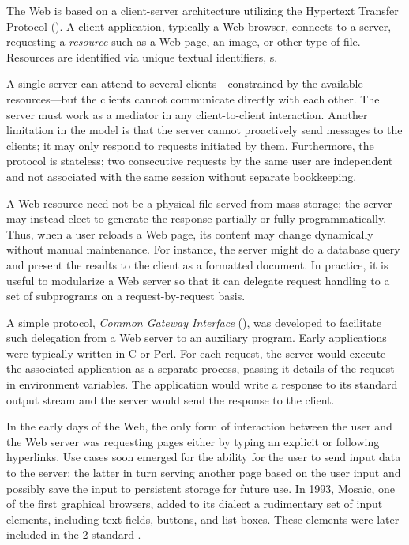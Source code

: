 The Web is based on a client-server architecture utilizing the Hypertext Transfer Protocol (). A client application, typically a Web browser, connects to a  server, requesting a \emph{resource} such as a Web page, an image, or other type of file. Resources are identified via unique textual identifiers, s. \cite{HTTP11}

A single server can attend to several clients---constrained by the available resources---but the clients cannot communicate directly with each other. The server must work as a mediator in any client-to-client interaction. Another limitation in the  model is that the server cannot proactively send messages to the clients; it may only respond to requests initiated by them. Furthermore, the protocol is stateless; two consecutive requests by the same user are independent and not associated with the same session without separate bookkeeping.

A Web resource need not be a physical file served from mass storage; the server may instead elect to generate the response partially or fully programmatically. Thus, when a user reloads a Web page, its content may change dynamically without manual maintenance. For instance, the server might do a database query and present the results to the client as a formatted  document. In practice, it is useful to modularize a Web server so that it can delegate request handling to a set of subprograms on a request-by-request basis. 

A simple protocol, \emph{Common Gateway Interface} (), was developed to facilitate such delegation from a Web server to an auxiliary program. Early  applications were typically written in C or Perl. For each request, the server would execute the associated  application as a separate process, passing it details of the request in environment variables. The application would write a  response to its standard output stream and the server would send the response to the client. \cite{CGI11}

In the early days of the Web, the only form of interaction between the user and the Web server was requesting pages either by typing an explicit  or following hyperlinks. Use cases soon emerged for the ability for the user to send input data to the server; the latter in turn serving another page based on the user input and possibly save the input to persistent storage for future use. In \num{1993}, Mosaic, one of the first graphical browsers, added to its  dialect a rudimentary set of input elements, including text fields, buttons, and list boxes. These elements were later included in the  2 standard \cite{HTML20}.

